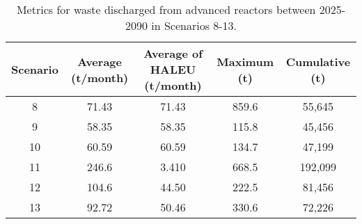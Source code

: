 \begin{table}
    \centering 
    \caption{Metrics for waste discharged from advanced reactors 
    between 2025-2090 in Scenarios 8-13.}
    \label{tab:1percent_waste}
    \begin{tabular}{c c c c c}
        \hline
        Scenario & Average (t/month) & Average of \gls{HALEU} (t/month) 
        & Maximum (t) & Cumulative (t)\\\hline
        8 & 71.43 & 71.43 & 859.6 & 55,645 \\
        9 & 58.35 & 58.35 & 115.8 & 45,456 \\
        10 & 60.59 & 60.59 & 134.7 & 47,199 \\
        11 & 246.6 & 3.410 & 668.5 & 192,099 \\
        12 & 104.6 & 44.50 & 222.5 & 81,456 \\
        13 & 92.72 & 50.46 & 330.6 & 72,226 \\
        \hline
    \end{tabular}
\end{table}